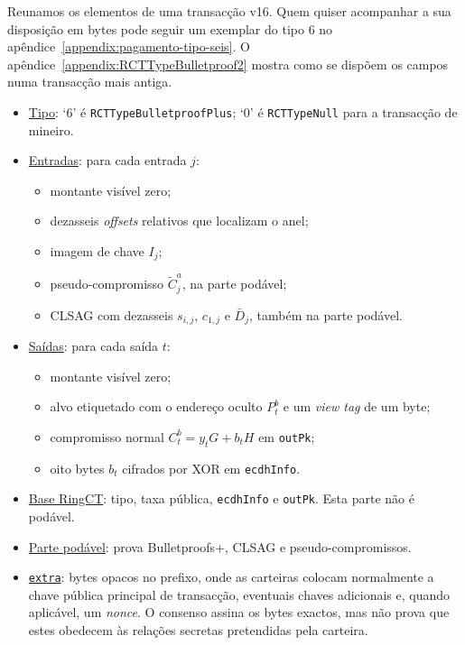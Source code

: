 Reunamos os elementos de uma transacção v16. Quem quiser acompanhar
a sua disposição em bytes pode seguir um exemplar do tipo 6 no
apêndice~\ref{appendix:pagamento-tipo-seis}. O apêndice~\ref{appendix:RCTTypeBulletproof2}
mostra como se dispõem os campos numa transacção mais antiga.

\begin{itemize}
    \item \underline{Tipo}: `6' é \texttt{RCTType}\allowbreak\texttt{BulletproofPlus}; `0' é
    \texttt{RCTTypeNull} para a transacção de mineiro.

    \item \underline{Entradas}: para cada entrada \(j\):
    \begin{itemize}
        \item montante visível zero;
        \item dezasseis \emph{offsets} relativos que localizam o anel;
        \item imagem de chave \(I_j\);
        \item pseudo-compromisso \(\widetilde C^a_j\), na parte podável;
        \item CLSAG com dezasseis \(s_{i,j}\), \(c_{1,j}\) e
        \(\bar D_j\), também na parte podável.
    \end{itemize}

    \item \underline{Saídas}: para cada saída \(t\):
    \begin{itemize}
        \item montante visível zero;
        \item alvo etiquetado com o endereço oculto \(P^b_t\) e um
        \emph{view tag} de um byte;
        \item compromisso normal \(C^b_t=y_tG+b_tH\) em \texttt{outPk};
        \item oito bytes \(b_t\) cifrados por XOR em \texttt{ecdhInfo}.
    \end{itemize}

    \item \underline{Base RingCT}: tipo, taxa pública, \texttt{ecdhInfo} e
    \texttt{outPk}. Esta parte não é podável.

    \item \underline{Parte podável}: prova Bulletproofs+, CLSAG e
    pseudo-compromissos.

    \item \underline{\texttt{extra}}: bytes opacos no prefixo, onde as
    carteiras colocam normalmente a chave pública principal de transacção,
    eventuais chaves adicionais e, quando aplicável, um \emph{nonce}. O
    consenso assina os bytes exactos, mas não prova que estes obedecem às
    relações secretas pretendidas pela carteira.
\end{itemize}

